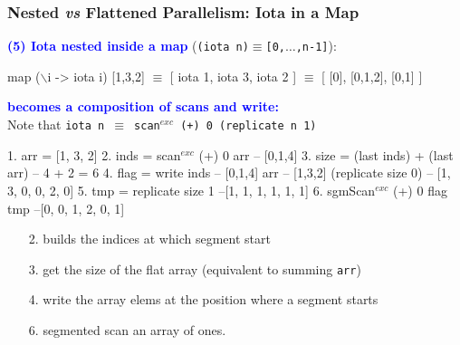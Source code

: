 \documentclass{beamer}
\newcommand{\blue}[1]{\textcolor{Blue}{{#1}}}
\renewcommand{\emph}[1]{\textcolor{structure}{#1}}
\newcommand{\emp}[1]{\textcolor{DikuRed}{ #1}}
\newcommand{\mymath}[1]{$ #1 $}
\newcommand{\myindu}[1]{^{#1}}
\begin{document}
\begin{frame}[fragile,t]
  \frametitle{Nested {\it vs} Flattened Parallelism: Iota in a Map}

\blue{\bf (5) Iota nested inside a map} ({\tt (iota n)$\equiv$[0,$\ldots$,n-1]}): 

\begin{colorcode}[fontsize=\scriptsize]
map (\mymath{\backslash}i -> iota i) \emp{[1,3,2]} \mymath{\equiv}
[ iota 1, iota 3, iota 2 ] \mymath{\equiv} [ [0], [0,1,2], [0,1] ]
\end{colorcode}

\medskip
\pause

\blue{\bf becomes a composition of scans and write:}\\
Note that {\tt iota n $\equiv$ scan$^{exc}$ (+) 0 (replicate n 1)}

\medskip

\begin{colorcode}[fontsize=\scriptsize]
1. arr  = [1, 3, 2]
2. inds = scan\mymath{\myindu{exc}} (+) 0 arr         -- [0,1,4]
3. size = (last inds) + (last arr) -- 4 + 2 = 6
4. flag = write inds  -- \emp{[0,1,4]}
                arr   -- \emp{[1,3,2]}
                (replicate size 0)
--              [1, 3, 0, 0, 2, 0]
5. \emp{tmp  = replicate size 1  --[1, 1, 1, 1, 1, 1]}
6. sgmScan\mymath{\myindu{exc}} (+) 0 flag \emp{tmp} \emph{--[0, 0, 1, 2, 0, 1]}
\end{colorcode}

\medskip

\begin{itemize}
    \item[2.] builds the indices at which segment start
    \item[3.] get the size of the flat array (equivalent to summing {\tt arr})
    \item[4.] write the array elems at the position where a segment starts
    \item[6.] \emp{segmented scan an array of ones}.
\end{itemize}

\end{frame}
\end{document}
